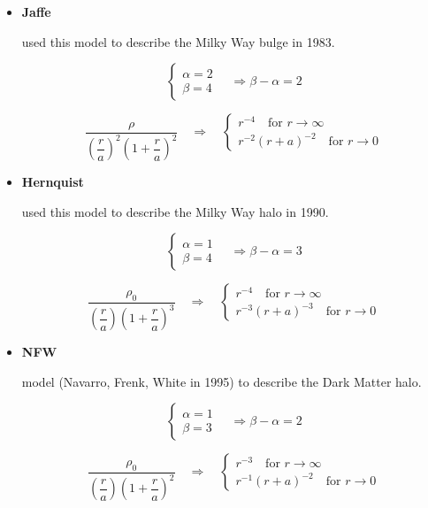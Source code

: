 \begin{itemize}
\item \textbf{Jaffe}

used this model to describe the Milky Way bulge in 1983.

$$
\begin{cases}
\alpha = 2 \\
\beta = 4 
\end{cases}
\quad \Rightarrow \beta - \alpha = 2
$$

$$
\dfrac{\rho}{\left(\dfrac{r}{a}\right)^2 \left(1 + \dfrac{r}{a}\right)^2}
\quad \Rightarrow \quad
 \begin{cases}
    r^{-4} \quad \text{for } r \to \infty \\
    r^{-2}(r + a)^{-2} \quad \text{for } r \to 0
\end{cases}
$$

\item \textbf{Hernquist}

used this model to describe the Milky Way halo in 1990.

$$
\begin{cases}
\alpha = 1 \\
\beta = 4 
\end{cases}
\quad \Rightarrow \beta - \alpha = 3
$$

$$
\dfrac{\rho_0}{\left(\dfrac{r}{a}\right) \left(1 + \dfrac{r}{a}\right)^3}
\quad \Rightarrow \quad
 \begin{cases}
    r^{-4} \quad \text{for } r \to \infty \\
    r^{-3}(r + a)^{-3} \quad \text{for } r \to 0
\end{cases}
$$

\item \textbf{NFW}

model (Navarro, Frenk, White in 1995) to describe the Dark Matter halo.

$$
\begin{cases}
\alpha = 1 \\
\beta = 3 
\end{cases}
\quad \Rightarrow \beta - \alpha = 2
$$

$$
\dfrac{\rho_0}{\left(\dfrac{r}{a}\right) \left(1 + \dfrac{r}{a}\right)^2}
\quad \Rightarrow \quad
\begin{cases}
    r^{-3} \quad \text{for } r \to \infty \\
    r^{-1}(r + a)^{-2} \quad \text{for } r \to 0
\end{cases}
$$

\end{itemize}

